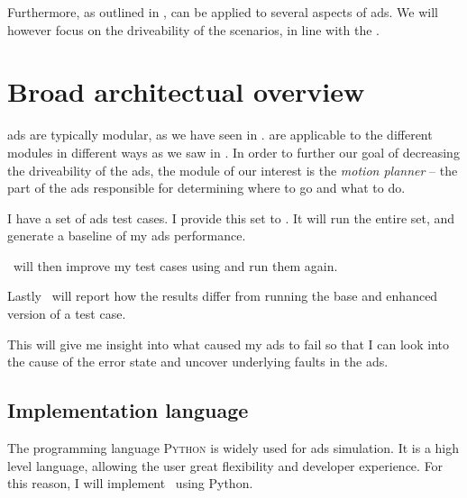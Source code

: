 Furthermore, as outlined in \citeauthor{LLM4AD},  can be applied to several aspects
of \acrlong{ads}. We will however focus on the driveability of the scenarios, in line with the
.


\section{Broad architectual overview}


\acrlong{ads} are typically modular, as we have seen in .
 are applicable to the different modules in different ways as we saw in
. In order to further our goal of decreasing the driveability of the
\acrshort{ads}, the module of our interest is the \emph{motion planner} -- the part of the
\acrshort{ads} responsible for determining where to go and what to do.

\begin{tcolorbox}[colback=gray!5!white,colframe=gray!75!black,title=User history
        of using \hefe]\label{user-history}
    I have a set of \acrfull{ads} test cases. I provide this set to \hefe. It will run the entire
    set, and generate a baseline of my \acrshort{ads} performance.

    \hefe~will then improve my test cases using  and run them again.

    Lastly \hefe~will report how the results differ from running the base and enhanced version of a
    test case.

    This will give me insight into what caused my \acrshort{ads} to fail so that I can look into the
    cause of the error state and uncover underlying faults in the \acrlong{ads}.

\end{tcolorbox}


\subsection{Implementation language}

The programming language \textsc{Python} is widely used for \acrfull{ads} simulation. It is a high
level language, allowing the user great flexibility and developer experience. For this reason, I
will implement \hefe~using Python.

